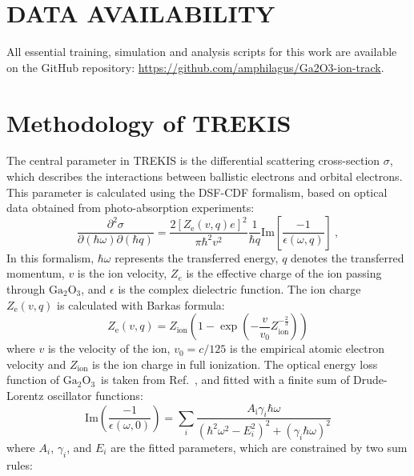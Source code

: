 \documentclass[aip,graphicx,amsmath,amssymb]{revtex4-1}
\newcommand{\ga}{$\text{Ga}_2\text{O}_3$}
\begin{document}
\section*{DATA AVAILABILITY}
All essential training, simulation and analysis scripts for this work are available on the 
GitHub repository: \url{https://github.com/amphilagus/Ga2O3-ion-track}.

\appendix

\section{Methodology of TREKIS}
\label{app:trekis}
The central parameter in TREKIS is the differential scattering cross-section 
$\sigma$, which describes the interactions between ballistic electrons and 
orbital electrons. 
This parameter is calculated using the DSF-CDF formalism, based 
on optical data obtained from photo-absorption experiments: 
\begin{equation} 
\frac{\partial^{2}\sigma}{\partial(\hbar\omega)\partial(\hbar q)} = 
\frac{2[Z_{\text{e}}(v,q)e]^{2}}{\pi\hbar^{2}v^{2}} \frac{1}{\hbar 
q}\mathrm{Im}[\frac{-1}{\epsilon(\omega,q)}]\ , \label{eq1} 
\end{equation} 
In this formalism, $\hbar\omega$ represents the transferred energy, $q$ denotes 
the transferred momentum, $v$ is the ion velocity, $Z_e$ is the effective 
charge of the ion passing through \ga, and $\epsilon$ is the complex 
dielectric function. 
The ion charge $Z_{\text{e}}(v,q)$ is calculated with Barkas formula:\cite{Gervais1994} 
\begin{equation} 
Z_{\text{e}}(v,q) = Z_{\text{ion}}(1-\exp(-\frac{v}{v_{0}}Z_{\text{ion}}^{-\frac{2}{3}})) 
\end{equation} 
where $v$ is the velocity of the ion, $v_{0}=c/125$ is the empirical atomic 
electron velocity and $Z_{\text{ion}}$ is the ion charge in full ionization. 
The optical energy loss function of \ga\ is taken from 
Ref.~, and fitted with a finite sum of Drude-Lorentz 
oscillator functions: 
\begin{equation} 
\mathrm{Im}(\frac{-1}{\epsilon(\omega,0)}) = \sum_{i} 
\frac{A_{\mathrm{i}}\gamma_{i}\hbar\omega}{(\hbar^{2}\omega^{2}-E_{i}^{2})^{2}+(\gamma_{i}\hbar\omega)^{2}} 
\end{equation} 
where $A_{i}$, $\gamma_{i}$, and $E_{i}$ are the fitted parameters, which are 
constrained by two sum rules: 
\end{document}
